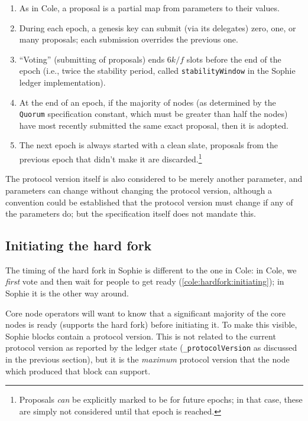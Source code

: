 \begin{enumerate}

\item
As in Cole, a proposal is a partial map from parameters to their values.

\item
During each epoch, a genesis key can submit (via its delegates) zero, one, or
many proposals; each submission overrides the previous one.

\item
``Voting'' (submitting of proposals) ends $6k/f$ slots before the end of the
epoch (i.e., twice the stability period, called \lstinline!stabilityWindow! in
the Sophie ledger implementation).

\item
At the end of an epoch, if the majority of nodes (as determined by the
\lstinline!Quorum! specification constant, which must be greater than half the
nodes) have most recently submitted the same exact proposal, then it is adopted.

\item
The next epoch is always started with a clean slate, proposals from the
previous epoch that didn't make it are discarded.\footnote{Proposals \emph{can}
be explicitly marked to be for future epochs; in that case, these are simply
not considered until that epoch is reached.}

\end{enumerate}

The protocol version itself is also considered to be merely another parameter,
and parameters can change without changing the protocol version, although a
convention could be established that the protocol version must change if any of
the parameters do; but the specification itself does not mandate this.

\subsection{Initiating the hard fork}
\label{sophie:hardfork:initiating}

The timing of the hard fork in Sophie is different to the one in Cole: in
Cole, we \emph{first} vote and then wait for people to get ready
(\cref{cole:hardfork:initiating}); in Sophie it is the other way around.

Core node operators will want to know that a significant majority of the core
nodes is ready (supports the hard fork) before initiating it. To make this
visible, Sophie blocks contain a protocol version. This is not related to the
current protocol version as reported by the ledger state
(\lstinline!_protocolVersion! as discussed in the previous section), but it is
the \emph{maximum} protocol version that the node which produced that block can
support.

